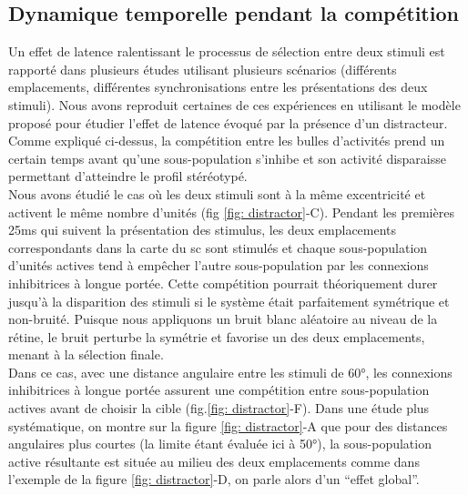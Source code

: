 \subsection{Dynamique temporelle pendant la compétition}

Un effet de latence ralentissant le processus de sélection entre deux stimuli est rapporté dans plusieurs études \cite{Findlay:1983, Weber:1994, Godijn:2002, Honda:2005} utilisant plusieurs scénarios (différents emplacements, différentes synchronisations entre les présentations des deux stimuli). Nous avons reproduit certaines de ces expériences en utilisant le modèle proposé pour étudier l'effet de latence évoqué par la présence d'un distracteur. Comme expliqué ci-dessus, la compétition entre les bulles d'activités prend un certain temps avant qu'une sous-population s'inhibe et son activité disparaisse permettant d'atteindre le profil stéréotypé.\\

Nous avons étudié le cas o\`u les deux stimuli sont à la même excentricité et activent le même nombre d'unités (fig \ref{fig: distractor}-C). Pendant les premières 25ms qui suivent la présentation des stimulus, les deux emplacements correspondants dans la carte du \gls{sc} sont stimulés et chaque sous-population d'unités actives tend à empêcher l'autre sous-population par les connexions inhibitrices à longue portée. Cette compétition pourrait théoriquement durer jusqu'à la disparition des stimuli si le système était parfaitement symétrique et non-bruité. Puisque nous appliquons un bruit blanc aléatoire au niveau de la rétine, le bruit perturbe la symétrie et favorise un des deux emplacements, menant à la sélection finale.\\

Dans ce cas, avec une distance angulaire entre les stimuli de 60°, les connexions inhibitrices à longue portée assurent une compétition entre sous-population actives avant de choisir la cible (fig.\ref{fig: distractor}-F). Dans une étude plus systématique, on montre sur la figure \ref{fig: distractor}-A que pour des distances angulaires plus courtes (la limite étant évaluée ici à 50°), la sous-population active résultante est située au milieu des deux emplacements comme dans l'exemple de la figure \ref{fig: distractor}-D, on parle alors d'un ``effet global''. \\

